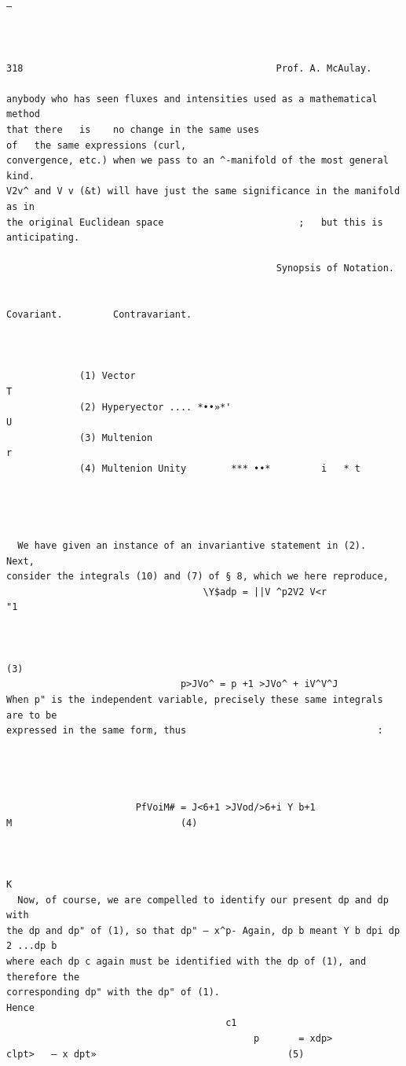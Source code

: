 \documentclass[10pt]{article}
\begin{document}
\begin{verbatim}

                                                                      —



318                                             Prof. A. McAulay.

anybody who has seen fluxes and intensities used as a mathematical method
that there   is    no change in the same uses                                       of   the same expressions (curl,
convergence, etc.) when we pass to an ^-manifold of the most general kind.
V2v^ and V v (&t) will have just the same significance in the manifold as in
the original Euclidean space                        ;   but this is anticipating.

                                                Synopsis of Notation.

                                                                           Covariant.         Contravariant.



             (1) Vector                                                                                T
             (2) Hyperyector .... *••»*'                                                               U
             (3) Multenion                                                                             r
             (4) Multenion Unity        *** ••*         i   * t




  We have given an instance of an invariantive statement in (2).                                                         Next,
consider the integrals (10) and (7) of § 8, which we here reproduce,
                                   \Y$adp = ||V ^p2V2 V<r                                        "1


                                                                                                                             (3)
                               p>JVo^ = p +1 >JVo^ + iV^V^J
When p" is the independent variable, precisely these same integrals are to be
expressed in the same form, thus                                  :




                       PfVoiM# = J<6+1 >JVod/>6+i Y b+1                                       M                              (4)


                                                                                                                         K
  Now, of course, we are compelled to identify our present dp and dp with
the dp and dp" of (1), so that dp" — x^p- Again, dp b meant Y b dpi dp 2 ...dp b
where each dp c again must be identified with the dp of (1), and therefore the
corresponding dp" with the dp" of (1).                                    Hence
                                       c1
                                            p       = xdp>                 clpt>   — x dpt»                                  (5)



\end{verbatim}
\end{document}
